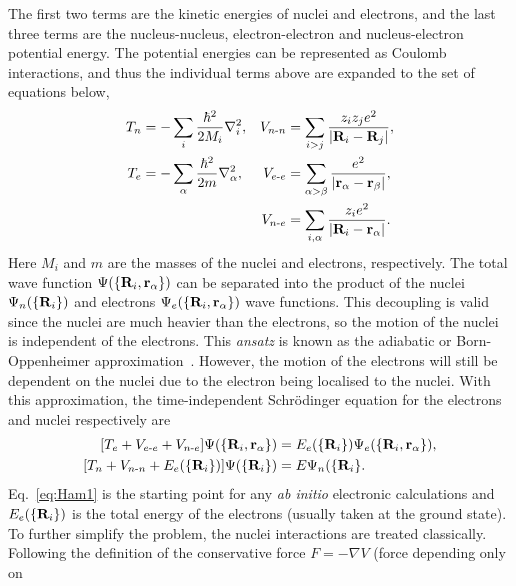 The first two terms are the kinetic energies of nuclei and electrons, and the last three terms 
are the nucleus-nucleus, electron-electron and nucleus-electron potential energy. The potential 
energies can be represented as Coulomb interactions, and thus the individual terms above are 
expanded to the set of equations below,
\begin{align}
T_{n} &= -\sum_{i} \frac{\hbar^2}{2M_{i}}\nabla_{i}^2, & V_{n\text{-}n} &= \sum_{i>j} \frac{z_{i}z_{j}e^2}{|{\bf R}_{i} - {\bf R}_{j}|}, \nonumber \\ 
T_{e} &= -\sum_{\alpha} \frac{\hbar^2}{2m}\nabla_{\alpha}^2,  & V_{e\text{-}e} &= \sum_{\alpha>\beta} \frac{e^2}{|{\bf r}_{\alpha} - {\bf r}_{\beta}|}, \nonumber \\
& & V_{n\text{-}e} &= \sum_{i,\alpha} \frac{z_{i}e^2}{|{\bf R}_{i}-{\bf r}_{\alpha}|}. \label{eq:HamFull}
\end{align}
Here $M_{i}$ and $m$ are the masses of the nuclei and electrons, respectively. The total 
wave function $\Psi(\{{\bf R}_{i},{\bf r}_{\alpha}\})$ can be separated into the product 
of the nuclei $\Psi_{n}(\{{\bf R}_{i}\})$ and electrons $\Psi_{e}(\{{\bf R}_{i},{\bf r}_{\alpha}\})$ 
wave functions. This decoupling is valid since the nuclei are much heavier than the electrons, 
so the motion of the nuclei is independent of the electrons. This \textit{ansatz} is known as 
the adiabatic or Born-Oppenheimer approximation~\cite{Born1927}. However, the motion of the 
electrons will still be dependent on the nuclei due to the electron being localised to the 
nuclei. With this approximation, the time-independent Schr\"{o}dinger equation for the 
electrons and nuclei respectively are
\begin{subequations}
\begin{align}
[T_{e} + V_{e\text{-}e} + V_{n\text{-}e}]\Psi(\{{\bf R}_{i},{\bf r}_{\alpha}\}) &= E_{e}(\{{\bf R}_{i}\})\Psi_{e}(\{{\bf R}_{i}, {\bf r}_{\alpha}\}), \label{eq:Ham1}\\
[T_{n} + V_{n\text{-}n} + E_{e}(\{{\bf R}_{i}\})]\Psi(\{{\bf R}_{i}\}) &= E\Psi_{n}(\{{\bf R}_{i}\}. \label{eq:Ham2}
\end{align}
\end{subequations}
Eq.~\eqref{eq:Ham1} is the starting point for any {\it ab initio} electronic calculations 
and $E_{e}(\{{\bf R}_{i}\})$ is the total energy of the electrons (usually taken at the 
ground state). To further simplify the problem, the nuclei interactions are treated classically. 
Following the definition of the conservative force $F = -\nabla V$ (force depending only on 
